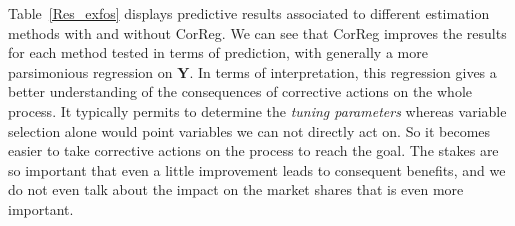 \documentclass[12pt,a4paper]{report}
\begin{document}
%
%	
%
%		
%		
		
\vspace{3mm}
	
	
Table~\ref{Res_exfos} displays predictive results associated to different estimation methods with and without {\sc CorReg}. We can see that {\sc CorReg} improves the results for each method tested in terms of prediction, with generally a more parsimonious regression on $\boldsymbol{Y}$. In terms of interpretation, this regression gives a better understanding of the consequences of corrective actions on the whole process. It typically permits to determine the \textit{tuning parameters} whereas variable selection alone would point variables we can not directly act on.	So it becomes easier to take corrective actions on the process to reach the goal. The stakes are so important that even a little improvement leads to consequent benefits, and we do not even talk about the impact on the market shares that is even more important.
		
\end{document}
